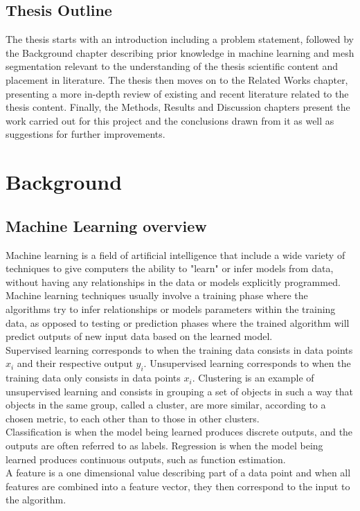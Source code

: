 \documentclass{kththesis}
\begin{document}
\section{Thesis Outline}
The thesis starts with an introduction including a problem statement, followed by the Background chapter describing prior knowledge in machine learning and mesh segmentation relevant to the understanding of the thesis scientific content and placement in literature. The thesis then moves on to the Related Works chapter, presenting a more in-depth review of existing and recent literature related to the thesis content. Finally, the Methods, Results and Discussion chapters present the work carried out for this project and the conclusions drawn from it as well as suggestions for further improvements. 

\chapter{Background}
\section{Machine Learning overview}
Machine learning is a field of artificial intelligence that include a wide variety of techniques to give computers the ability to "learn" or infer models from data, without having any relationships in the data or models explicitly programmed. Machine learning techniques usually involve a training phase where the algorithms try to infer relationships or models parameters within the training data, as opposed to testing or prediction phases where the trained algorithm will predict outputs of new input data based on the learned model. \\
Supervised learning  corresponds to when the training data consists in data points $x_i$ and their respective output $y_i$. Unsupervised learning corresponds to when the training data only consists in data points $x_i$. Clustering is an example of unsupervised learning and consists in grouping a set of objects in such a way that objects in the same group, called a cluster, are more similar, according to a chosen metric, to each other than to those in other clusters.\\
Classification is when the model being learned produces discrete outputs, and the outputs are often referred to as labels. Regression is when the model being learned produces  continuous outputs, such as function estimation. \\
A feature is a one dimensional value describing part of a data point and when all features are combined into a feature vector, they then correspond to the input to the algorithm. 
\end{document}
